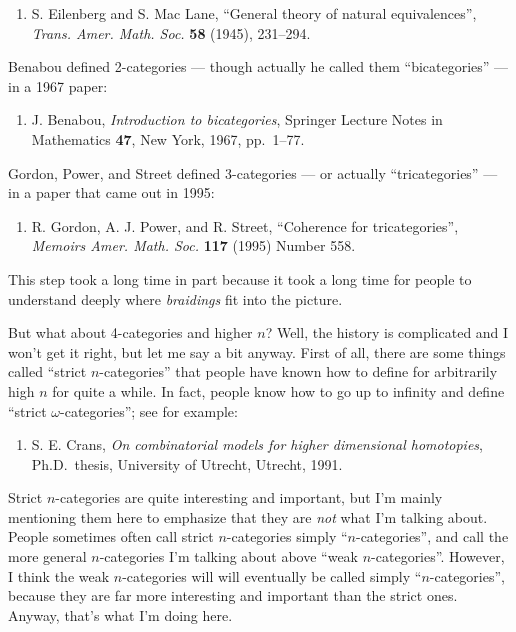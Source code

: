 \documentclass{article}
\def\tightlist{}
\begin{document}
\begin{enumerate}
\def\labelenumi{\arabic{enumi})}
\tightlist
\item
  S. Eilenberg and S. Mac Lane, ``General theory of natural
  equivalences'', \emph{Trans. Amer. Math. Soc.} \textbf{58} (1945),
  231--294.
\end{enumerate}

Benabou defined 2-categories --- though actually he called them
``bicategories'' --- in a 1967 paper:

\begin{enumerate}
\def\labelenumi{\arabic{enumi})}
\setcounter{enumi}{1}
\tightlist
\item
  J. Benabou, \emph{Introduction to bicategories}, Springer Lecture
  Notes in Mathematics \textbf{47}, New York, 1967, pp.~1--77.
\end{enumerate}

Gordon, Power, and Street defined 3-categories --- or actually
``tricategories'' --- in a paper that came out in 1995:

\begin{enumerate}
\def\labelenumi{\arabic{enumi})}
\setcounter{enumi}{2}
\tightlist
\item
  R. Gordon, A. J. Power, and R. Street, ``Coherence for
  tricategories'', \emph{Memoirs Amer. Math. Soc.} \textbf{117} (1995)
  Number 558.
\end{enumerate}

This step took a long time in part because it took a long time for
people to understand deeply where \emph{braidings} fit into the picture.

But what about 4-categories and higher \(n\)? Well, the history is
complicated and I won't get it right, but let me say a bit anyway. First
of all, there are some things called ``strict \(n\)-categories'' that
people have known how to define for arbitrarily high \(n\) for quite a
while. In fact, people know how to go up to infinity and define ``strict
\(\omega\)-categories''; see for example:

\begin{enumerate}
\def\labelenumi{\arabic{enumi})}
\setcounter{enumi}{3}
\tightlist
\item
  S. E. Crans, \emph{On combinatorial models for higher dimensional
  homotopies}, Ph.D.~thesis, University of Utrecht, Utrecht, 1991.
\end{enumerate}

Strict \(n\)-categories are quite interesting and important, but I'm
mainly mentioning them here to emphasize that they are \emph{not} what
I'm talking about. People sometimes often call strict \(n\)-categories
simply ``\(n\)-categories'', and call the more general \(n\)-categories
I'm talking about above ``weak \(n\)-categories''. However, I think the
weak \(n\)-categories will will eventually be called simply
``\(n\)-categories'', because they are far more interesting and
important than the strict ones. Anyway, that's what I'm doing here.
\end{document}
